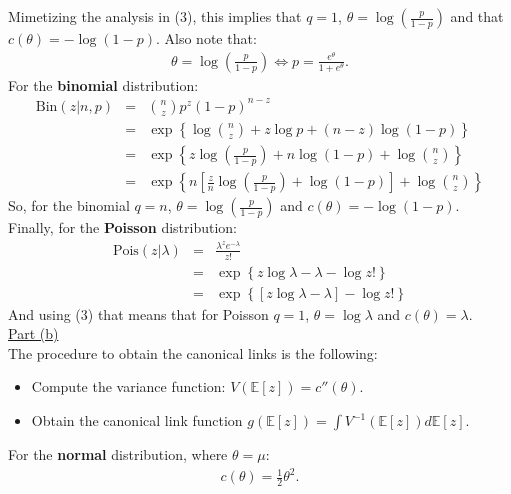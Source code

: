 \documentclass[a4paper, 11pt]{article}
\begin{document}
Mimetizing the analysis in (3), this implies that $q=1$, $\theta = \log \left( \frac{p}{1-p} \right)$ and that $c(\theta) = -\log{(1-p)}$. Also note that:
\begin{eqnarray}
\theta = \log \left( \frac{p}{1-p} \right) \Leftrightarrow p = \frac{e^\theta}{1 + e^\theta}.
\end{eqnarray}
For the \textbf{binomial} distribution:
\begin{eqnarray}
\text{Bin}(z | n,p) &=& {n \choose z} p^z (1-p)^{n-z}   \nonumber \\
&=& \exp \left\{ \log{n \choose z} + z \log p + (n-z) \log{(1-p)} \right\} \nonumber \\
&=& \exp \left\{ z \log \left( \frac{p}{1-p} \right) + n \log{(1-p)} + \log{n \choose z} \right\} \nonumber \\
&=& \exp \left\{ n \left[ \frac{z}{n} \log\left( \frac{p}{1-p} \right) + \log{(1-p)} \right] + \log{n \choose z} \right\} \nonumber
\end{eqnarray}
So, for the binomial $q=n$, $\theta = \log \left( \frac{p}{1-p} \right)$ and $c(\theta) = -\log{(1-p)}$.\\
\newline Finally, for the \textbf{Poisson} distribution:
\begin{eqnarray}
\text{Pois}(z | \lambda) &=& \frac{\lambda^z e^{-\lambda}}{z!} \nonumber \\
&=& \exp \left\{ z \log \lambda - \lambda - \log z! \right\} \nonumber \\
&=& \exp \left\{ [z \log \lambda - \lambda] - \log z! \right\} \nonumber
\end{eqnarray}
And using (3) that means that for Poisson $q = 1$, $\theta = \log \lambda$ and $c(\theta) =\lambda$.\\
\newline \underline{Part (b)}\\
\newline The procedure to obtain the canonical links is the following:
\begin{itemize}
\item Compute the variance function: $V(\mathbb{E}[z]) = c''(\theta)$.
\item Obtain the canonical link function $g(\mathbb{E}[z]) = \int V^{-1}(\mathbb{E}[z]) d\mathbb{E}[z]$.
\end{itemize}
For the \textbf{normal} distribution, where $\theta = \mu$:
\begin{eqnarray}
c(\theta) = \frac{1}{2} \theta^2. \nonumber
\end{eqnarray}
\end{document}
